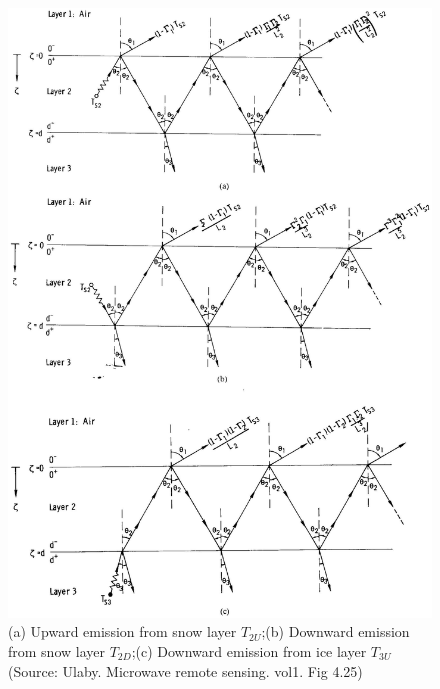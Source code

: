 \begin{figure}[!hbp]
  \centering
   \includegraphics[scale=0.2]{incoherent_Tb.eps} 
  \caption{(a) Upward emission from snow layer $T_{2U}$;(b) Downward emission from snow layer $T_{2D}$;(c) Downward emission from ice layer $T_{3U}$(Source: Ulaby. Microwave remote sensing. vol1. Fig 4.25)}
  \label{fig:incoherent_Tb}
\end{figure}

